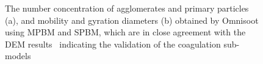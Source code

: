 \begin{figure}[H]
\begin{subfigure}[t]{0.4\textwidth}
	\end{subfigure}
	\caption{The number concentration of agglomerates and primary particles (a), and mobility and gyration diameters (b) obtained by Omnisoot using MPBM and SPBM, which are in close agreement with the DEM results~\citep{kholghy2021surface} indicating the validation of the coagulation sub-models}
	\label{fig:coagvalid_Nd} 
\end{figure}


\begin{figure}[H]
	\centering
	\begin{subfigure}[t]{0.4\textwidth}
	\end{subfigure}
	\begin{subfigure}[t]{0.4\textwidth}
		\begin{tikzpicture}

\end{tikzpicture}
\end{subfigure}
\end{figure}
